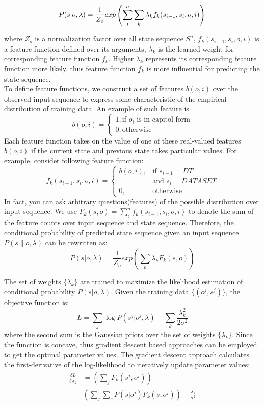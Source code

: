 \documentclass[11pt]{article}
\begin{document}
\[
P(s | o,\lambda) = \frac{1}{Z_o} exp \left( \sum_{i}^n \sum_{k} \lambda_{k} f_{k}(s_{i-1}, s_{i}, o, i) \right)  \\
\]

where $Z_o$ is a normalization factor over all state sequence $S^n$, $f_{k}(s_{i-1}, s_{i}, o, i)$ is a feature function defined over its arguments, $\lambda_{k}$ is the learned weight for corresponding feature function $f_k$. Higher $\lambda_{k}$ represents its corresponding feature function more likely, thus feature function $f_k$ is more influential for predicting the state sequence. \\

To define feature functions, we construct a set of features $b(o, i)$ over the observed input sequence to express some characteristic of the empirical distribution of training data. An example of such feature is\\
\[
	b(o, i) = 
	\begin{cases}
		1, \text{if $o_i$ is in capitol form} \\
		0, \text{otherwise}
	\end{cases}
\]
Each feature function takes on the value of one of these real-valued features $b(o, i)$ if the current state and previous state takes particular values. For example, consider following feature function:
\[
	f_k(s_{i-1}, s_i, o, i) = 
	\begin{cases}
		b(o, i), &\text{if $s_{i-1} = DT$} \\
			  & \text{and $s_{i} = DATASET$}\\
		0,	   &\text{otherwise}
	\end{cases}
\]
In fact, you can ask arbitrary questions(features) of the possible distribution over input sequence. We use $F_k(s, o) = \sum_{i}^n f_{k}(s_{i-1}, s_{i}, o, i)$ to denote the sum of the feature counts over input sequence and state sequence. Therefore, the conditional probability of predicted state sequence given an input sequence $P(s \| o, \lambda)$ can be rewritten as:
\[
	P(s | o, \lambda) = \frac{1}{Z_o} exp \left( \sum_{k} \lambda_{k} F_k(s, o) \right)
\]

The set of weights $\{ \lambda_k \}$ are trained to maximize the likelihood estimation of conditional probability $P(s | o, \lambda)$. Given the training data $\{(o^j, s^j)\}$, the objective function is:
\[
	L = \sum_{j} \log P(s^j | o^j, \lambda) -\sum_k \frac{\lambda_k^2}{2 \sigma^2} 
\]
where the second sum is the Gaussian priors over the set of weights $\{ \lambda_k \}$. Since the function is concave, thus gradient descent based approaches can be employed to get the optimal parameter values. The gradient descent approach calculates the first-derivative of the log-likelihood to iteratively update parameter values:
\begin{align*}
	\frac{\delta L}{\delta \lambda_k} & = \left( \sum_j F_k(s^j, o^j) \right) - \\
							& \left( \sum_j \sum_s P(s|o^j) F_k(s, o^j)\right) - \frac{\lambda_k}{\sigma^2} 
\end{align*}
\end{document}

